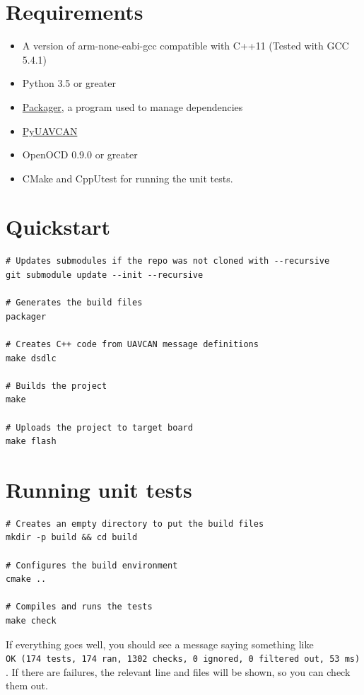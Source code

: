 \section{Requirements}\label{requirements}

\begin{itemize}
\tightlist
\item
  A version of arm-none-eabi-gcc compatible with C++11 (Tested with GCC
  5.4.1)
\item
  Python 3.5 or greater
\item
  \href{https://github.com/cvra/packager}{Packager}, a program used to
  manage dependencies
\item
  \href{https://github.com/UAVCAN/pyuavcan}{PyUAVCAN}
\item
  OpenOCD 0.9.0 or greater
\item
  CMake and CppUtest for running the unit tests.
\end{itemize}

\section{Quickstart}\label{quickstart}

\begin{verbatim}
# Updates submodules if the repo was not cloned with --recursive
git submodule update --init --recursive

# Generates the build files
packager

# Creates C++ code from UAVCAN message definitions
make dsdlc

# Builds the project
make

# Uploads the project to target board
make flash
\end{verbatim}

\section{Running unit tests}\label{running-unit-tests}

\begin{verbatim}
# Creates an empty directory to put the build files
mkdir -p build && cd build

# Configures the build environment
cmake ..

# Compiles and runs the tests
make check
\end{verbatim}

If everything goes well, you should see a message saying something like
\texttt{OK\ (174\ tests,\ 174\ ran,\ 1302\ checks,\ 0\ ignored,\ 0\ filtered\ out,\ 53\ ms)}.
If there are failures, the relevant line and files will be shown, so you
can check them out.

